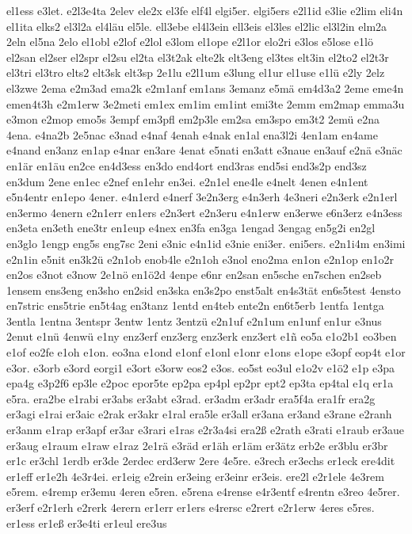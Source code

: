 {el1ess
e3let.
e2l3e4ta
2elev
ele2x
el3fe
elf4l
elgi5er.
elgi5ers
e2l1id
e3lie
e2lim
eli4n
el1ita
elks2
el3l2a
el4läu
el5le.
ell3ebe
el4l3ein
ell3eis
el3les
el2lic
el3l2in
elm2a
2eln
el5na
2elo
el1obl
e2lof
e2lol
e3lom
el1ope
e2l1or
elo2ri
e3los
e5lose
e1lö
el2san
el2ser
el2spr
el2su
el2ta
el3t2ak
elte2k
elt3eng
el3tes
elt3in
el2to2
el2t3r
el3tri
el3tro
elts2
elt3sk
elt3sp
2e1lu
e2l1um
e3lung
el1ur
el1use
e1lü
e2ly
2elz
el3zwe
2ema
e2m3ad
ema2k
e2m1anf
em1ans
3emanz
e5mä
em4d3a2
2eme
eme4n
emen4t3h
e2m1erw
3e2meti
em1ex
em1im
em1int
emi3te
2emm
em2map
emma3u
e3mon
e2mop
emo5s
3empf
em3pfl
em2p3le
em2sa
em3spo
em3t2
2emü
e2na
4ena.
e4na2b
2e5nac
e3nad
e4naf
4enah
e4nak
en1al
ena3l2i
4en1am
en4ame
e4nand
en3anz
en1ap
e4nar
en3are
4enat
e5nati
en3att
e3naue
en3auf
e2nä
e3näc
en1är
en1äu
en2ce
en4d3ess
en3do
end4ort
end3ras
end5si
end3s2p
end3sz
en3dum
2ene
en1ec
e2nef
en1ehr
en3ei.
e2n1el
ene4le
e4nelt
4enen
e4n1ent
e5n4entr
en1epo
4ener.
e4n1erd
e4nerf
3e2n3erg
e4n3erh
4e3neri
e2n3erk
e2n1erl
en3ermo
4enern
e2n1err
en1ers
e2n3ert
e2n3eru
e4n1erw
en3erwe
e6n3erz
e4n3ess
en3eta
en3eth
ene3tr
en1eup
e4nex
en3fa
en3ga
1engad
3engag
en5g2i
en2gl
en3glo
1engp
eng5s
eng7sc
2eni
e3nic
e4n1id
e3nie
eni3er.
eni5ers.
e2n1i4m
en3imi
e2n1in
e5nit
en3k2ü
e2n1ob
enob4le
e2n1oh
e3nol
eno2ma
en1on
e2n1op
en1o2r
en2os
e3not
e3now
2e1nö
en1ö2d
4enpe
e6nr
en2san
en5sche
en7schen
en2seb
1ensem
ens3eng
en3sho
en2sid
en3ska
en3s2po
enst5alt
en4s3tät
en6s5test
4ensto
en7stric
ens5trie
en5t4ag
en3tanz
1entd
en4teb
ente2n
en6t5erb
1entfa
1entga
3entla
1entna
3entspr
3entw
1entz
3entzü
e2n1uf
e2n1um
en1unf
en1ur
e3nus
2enut
e1nü
4enwü
e1ny
enz3erf
enz3erg
enz3erk
enz3ert
e1ñ
eo5a
e1o2b1
eo3ben
e1of
eo2fe
e1oh
e1on.
eo3na
e1ond
e1onf
e1onl
e1onr
e1ons
e1ope
e3opf
eop4t
e1or
e3or.
e3orb
e3ord
eorgi1
e3ort
e3orw
eos2
e3os.
eo5st
eo3ul
e1o2v
e1ö2
e1p
e3pa
epa4g
e3p2f6
ep3le
e2poc
epor5te
ep2pa
ep4pl
ep2pr
ept2
ep3ta
ep4tal
e1q
er1a
e5ra.
era2be
e1rabi
er3abs
er3abt
e3rad.
er3adm
er3adr
era5f4a
era1fr
era2g
er3agi
e1rai
er3aic
e2rak
er3akr
e1ral
era5le
er3all
er3ana
er3and
e3rane
e2ranh
er3anm
e1rap
er3apf
er3ar
e3rari
e1ras
e2r3a4si
era2ß
e2rath
e3rati
e1raub
er3aue
er3aug
e1raum
e1raw
e1raz
2e1rä
e3räd
er1äh
er1äm
er3ätz
erb2e
er3blu
er3br
er1c
er3chl
1erdb
er3de
2erdec
erd3erw
2ere
4e5re.
e3rech
er3echs
er1eck
ere4dit
er1eff
er1e2h
4e3r4ei.
er1eig
e2rein
er3eing
er3einr
er3eis.
ere2l
e2r1ele
4e3rem
e5rem.
e4remp
er3emu
4eren
e5ren.
e5rena
e4rense
e4r3entf
e4rentn
e3reo
4e5rer.
er3erf
e2r1erh
e2rerk
4erern
er1err
er1ers
e4rersc
e2rert
e2r1erw
4eres
e5res.
er1ess
er1eß
er3e4ti
er1eul
ere3us
}
